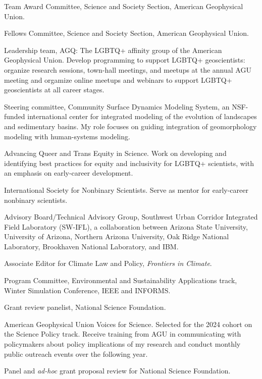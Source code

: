 \item[2026--present] Team Award Committee, Science and Society Section,
  American Geophysical Union.
\item[2026--present] Fellows Committee, Science and Society Section,
American Geophysical Union.
\item[2026--present] Leadership team, AGQ: The LGBTQ+ affinity group of the
  American Geophysical Union. Develop programming to support LGBTQ+
  geoscientists: organize research sessions, town-hall meetings, and meetups
  at the annual AGU meeting and orgamize online meetups and webinars to support
  LGBTQ+ geoscientists at all career stages.
\item[2024--present] Steering committee, Community Surface Dynamics Modeling
  System, an NSF-funded international center for integrated modeling of
  the evolution of landscapes and sedimentary basins. My role focuses on guiding
  integration of geomorphology modeling with human-systems modeling.
\item[2024--present] Advancing Queer and Trans Equity in Science.
  Work on developing and identifying best practices for equity and
  inclusivity for LGBTQ+ scientists, with an emphasis on early-career development.
\item[2023--present] International Society for Nonbinary Scientists.
Serve as mentor for early-career nonbinary scientists.
\item[2023--2026] Advisory Board/Technical Advisory Group,
Southwest Urban Corridor Integrated Field Laboratory (SW-IFL),
a collaboration between Arizona State University, University of Arizona,
Northern Arizona University, Oak Ridge National Laboratory,
Brookhaven National Laboratory, and IBM.
\item[2021--present] Associate Editor for Climate Law and Policy,
   \emph{Frontiers in Climate}.
\item[2016--2025] Program Committee,
  Environmental and Sustainability Applications track,
  Winter Simulation Conference, IEEE and INFORMS.
\item[2025] Grant review panelist, National Science Foundation.
\item[2024--2025] American Geophysical Union Voices for Science. Selected for
the 2024 cohort on the Science Policy track. Receive training from AGU in
communicating with policymakers about policy implications of my research and
conduct monthly public outreach events over the following year.
\item[2023] Panel and \emph{ad-hoc\/} grant proposal review for National Science Foundation.
